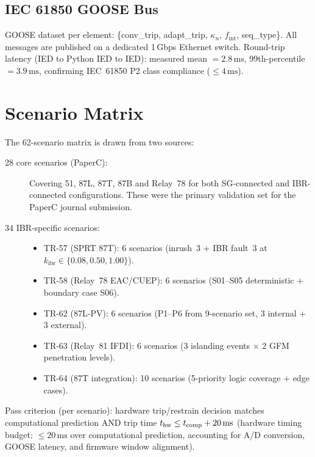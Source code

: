 \documentclass[11pt, a4paper]{article}
\newcommand{\kn}{\kappa_n}
\newcommand{\kibr}{k_{\mathrm{ibr}}}
\newcommand{\fint}{f_{\mathrm{int}}}
\begin{document}
\subsection{IEC 61850 GOOSE Bus}

GOOSE dataset per element: \{conv\_trip, adapt\_trip, $\kn$, $\fint$,
seq\_type\}.  All messages are published on a dedicated 1\,Gbps
Ethernet switch.  Round-trip latency (IED to Python IED to IED):
measured mean $= 2.8\,\text{ms}$, 99th-percentile $= 3.9\,\text{ms}$,
confirming IEC~61850 P2 class compliance ($\leq 4\,\text{ms}$).

\section{Scenario Matrix}
\label{sec:scenarios}

The 62-scenario matrix is drawn from two sources:

\begin{description}
  \item[28 core scenarios (PaperC):]
    Covering 51, 87L, 87T, 87B and Relay~78 for both SG-connected and
    IBR-connected configurations.  These were the primary validation set
    for the PaperC journal submission.

  \item[34 IBR-specific scenarios:]
    \begin{itemize}
      \item TR-57 (SPRT 87T): 6 scenarios
        (inrush~3 + IBR fault~3 at $\kibr \in \{0.08, 0.50, 1.00\}$).
      \item TR-58 (Relay~78 EAC/CUEP): 6 scenarios
        (S01--S05 deterministic + boundary case S06).
      \item TR-62 (87L-PV): 6 scenarios
        (P1--P6 from 9-scenario set, 3 internal + 3 external).
      \item TR-63 (Relay~81 IFDI): 6 scenarios
        (3 islanding events $\times$ 2 GFM penetration levels).
      \item TR-64 (87T integration): 10 scenarios
        (5-priority logic coverage + edge cases).
    \end{itemize}
\end{description}

Pass criterion (per scenario): hardware trip/restrain decision matches
computational prediction AND trip time $t_{\rm hw} \leq t_{\rm comp} + 20\,\text{ms}$
(hardware timing budget: $\leq 20\,\text{ms}$ over computational prediction,
accounting for A/D conversion, GOOSE latency, and firmware window alignment).
\end{document}

